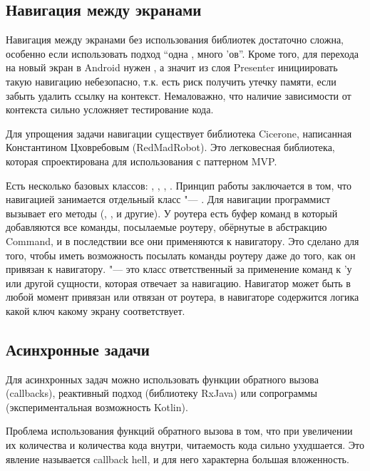 \subsection{Навигация между экранами}
\label{subsec:navigation}
Навигация между экранами без использования библиотек достаточно сложна, особенно если использовать подход ``одна , много 'ов''.
Кроме того, для перехода на новый экран в Android нужен , а значит из слоя Presenter инициировать такую навигацию небезопасно, т.к. есть риск получить утечку памяти, если забыть удалить ссылку на контекст.
Немаловажно, что наличие зависимости от контекста сильно усложняет тестирование кода.

Для упрощения задачи навигации существует библиотека Cicerone, написанная Константином Цховребовым (RedMadRobot).
Это легковесная библиотека, которая спроектирована для использования с паттерном MVP\@.


Есть несколько базовых классов: , , , .
Принцип работы заключается в том, что навигацией занимается отдельный класс "--- .
Для навигации программист вызывает его методы (, ,  и другие).
У роутера есть буфер команд в который добавляются все команды, посылаемые роутеру, обёрнутые в абстракцию Command, и в последствии все они применяются к навигатору.
Это сделано для того, чтобы иметь возможность посылать команды роутеру даже до того, как он привязан к навигатору.
 "--- это класс ответственный за применение команд к 'у или другой сущности, которая отвечает за навигацию.
Навигатор может быть в любой момент привязан или отвязан от роутера, в навигаторе содержится логика какой ключ какому экрану соответствует.

\subsection{Асинхронные задачи}
\label{subsec:asyncTasks}
Для асинхронных задач можно использовать функции обратного вызова (callbacks), реактивный подход (библиотеку RxJava) или сопрограммы (экспериментальная возможность Kotlin).

Проблема использования функций обратного вызова в том, что при увеличении их количества и количества кода внутри, читаемость кода сильно ухудшается.
Это явление называется callback hell, и для него характерна большая вложенность.

